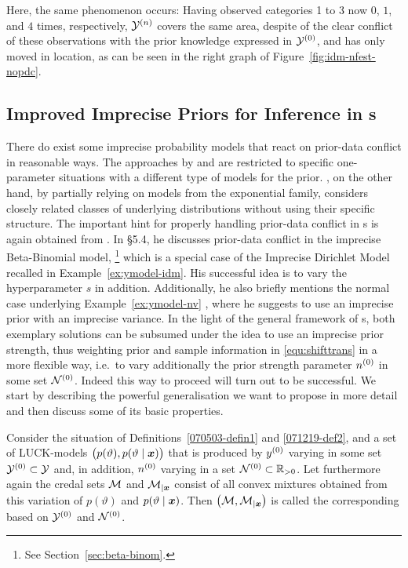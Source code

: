 \begin{example}
\label{ex:jstp-6}
Here, the same phenomenon occurs:
Having observed categories 1 to 3 now $0$, $1$, and $4$
times, respectively, $\mathcal{Y}^{(n)}$ covers the same area, despite of the clear conflict of these
observations with the prior knowledge expressed in $\mathcal{Y}^{(0)}$,
and has only moved in location, as can be seen
in the right graph of Figure~\ref{fig:idm-nfest-nopdc}.
\end{example}


\subsection{Improved Imprecise Priors for Inference in \model s}
\label{sec:4-gw-071216}

There do exist some imprecise probability models that react on
prior-data conflict in reasonable ways. The approaches by
\textcite{1991:pericchi} and \textcite{1994:coolen}
are restricted to specific one-parameter situations with a different type
of models for the prior. \textcite{2005:whitcomb}, on
the other hand, by partially relying on models from the exponential
family, considers closely related classes of underlying
distributions without using their specific structure. The important
hint for properly handling prior-data conflict in
\model s is again obtained from \textcite{1991:walley}.
In \S 5.4, he discusses prior-data conflict in the imprecise
Beta-Binomial model,%
\footnote{See Section~\ref{sec:beta-binom}.}
which is a special case of the Imprecise
Dirichlet Model recalled in Example~\ref{ex:ymodel-idm}. His successful idea is to
vary the hyperparameter $s$ in addition. Additionally, he also
briefly mentions the normal case underlying Example~\ref{ex:ymodel-nv}
\parencite[\S 1.1.5 (k)]{1991:walley}, where he suggests to use an
imprecise prior with an imprecise variance. In the light of the
general framework of \model s, both exemplary solutions
can be subsumed under the idea to use an imprecise prior strength,
thus weighting prior and sample information in
\eqref{equ:shifttrans} in a more flexible way, i.e.\ to vary
additionally the prior strength parameter $n^{(0)}$ in some set $\mathcal{N}^{(0)}$.
Indeed this way to proceed will turn out to be successful.
We start by describing the powerful generalisation we want to
propose in more detail and then discuss some of its basic
properties.
%
%
%
%
\begin{definition}[\nymodel s]\label{071221-def}%
Consider the situation of Definitions~\ref{070503-defin1}
and \ref{071219-def2}, and a set of LUCK-models
$\big(p(\vartheta),p(\vartheta\mid{\bm x})\big)$ that is produced by
$y^{(0)}$ varying in some set $\mathcal{Y}^{(0)} \subset \mathcal{Y}$
and, in addition, $n^{(0)}$ varying in a set $\mathcal{N}^{(0)} \subset \mathbb{R}_{>0}$.
Let furthermore again the credal sets ${\cal M}$ and ${\cal M}_{|{\bm x}}$ consist
of all convex mixtures obtained from this variation of $p(\vartheta)$ and
$p(\vartheta\mid{\bm x})$. Then $\big({\cal M}, {\cal M}_{|{\bm x}}\big)$ is
called the corresponding \emph{\nymodel } based on $\mathcal{Y}^{(0)}$ and $\mathcal{N}^{(0)}$.
\end{definition}


